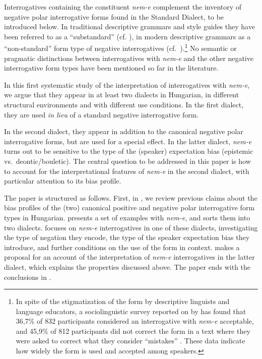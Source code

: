 \documentclass[output=paper,colorlinks,citecolor=brown]{langscibook}
\begin{document}
	Interrogatives containing the constituent \textit{nem-e} complement the inventory of negative polar interrogative forms found in the Standard Dialect, to be introduced below. In traditional descriptive grammars and style guides they have been referred to as a ``substandard'' (cf. \citealt{szasz1905, tompa1961-62, gretsy-kovalovszky}), in modern descriptive grammars as a ``non-standard'' form type of negative interrogatives (cf.~\citealt[2]{kenesei-etal}).\footnote{In spite of the stigmatization of the form by descriptive linguists and language educators, a sociolinguistic survey reported on by \citet{kassai1994} has found that  36,7\%  of 832 participants considered an interrogative with \textit{nem-e} acceptable, and 45,9\% of 812 participants did not correct the form in a text where they were asked to correct what they consider ``mistakes'' . These data indicate how widely the form is used and accepted among speakers.}
	No semantic or pragmatic distinctions between interrogatives with \textit{nem\nobreakdash-e} and the other negative interrogative form types have been mentioned so far in the literature. 

	
	In this first systematic study of the interpretation of interrogatives with  \textit{nem-e}, we argue that they appear in at least two dialects in Hungarian, in different structural environments and with different use conditions.  In the first dialect, they are used \textit{in lieu} of a  standard negative interrogative form.

	In the second dialect, they appear in addition to the canonical negative polar interrogative forms, but are used for a special effect. In the latter dialect, \textit{nem-e}  turns out to be sensitive to the type of the (speaker) expectation bias (epistemic vs.~deontic/bouletic). The central question to be addressed in this paper is how to account for the interpretational features of \textit{nem-e} in the second dialect, with particular attention to its bias profile.  

	
	The paper is structured as follows. First, in , we review  previous claims about the bias profiles of the (two) canonical positive and negative polar interrogative form types in Hungarian.  presents a set of examples with \textit{nem-e}, and sorts them into two dialects.  focuses on \textit{nem-e} interrogatives in one of these  dialects, investigating the type of negation they encode, the type of the speaker expectation bias they introduce, and further conditions on the use of the form in context.  makes a proposal for an account of the interpretation of \textit{nem-e} interrogatives in the latter dialect, which explains the properties discussed above. The paper ends with the conclusions in .
	
\end{document}
